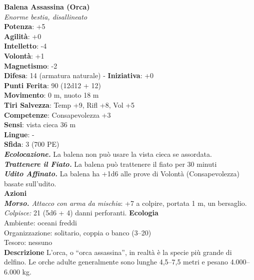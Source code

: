 \begin{multicols}{2}
\medskip\textbf{Balena Assassina (Orca)}\\
\emph{Enorme bestia, disallineato}\\
\textbf{Potenza}: +5\\
\textbf{Agilità}: +0\\
\textbf{Intelletto}: -4\\
\textbf{Volontà}: +1\\
\textbf{Magnetismo}: -2\\
\textbf{Difesa}: 14 (armatura naturale) - \textbf{Iniziativa}: +0\\
\textbf{Punti Ferita}: 90 (12d12 + 12)\\
\textbf{Movimento}: 0 m, nuoto 18 m\\
\textbf{Tiri Salvezza}: Temp +9, Rifl +8, Vol +5\\
\textbf{Competenze}: Consapevolezza +3\\
\textbf{Sensi}: vista cieca 36 m\\
\textbf{Lingue}: -\\
\textbf{Sfida}: 3 (700 PE)\smallskip\\
\emph{\textbf{Ecolocazione.}} La balena non può usare la vista cieca se assordata.\\
\emph{\textbf{Trattenere il Fiato.}} La balena può trattenere il fiato per 30 minuti\\
\emph{\textbf{Udito Affinato.}} La balena ha +1d6 alle prove di Volontà (Consapevolezza) basate sull'udito.\\
\smallskip\textbf{Azioni}\\
\emph{\textbf{Morso.} Attacco con arma da mischia}: +7 a colpire, portata 1 m, un bersaglio.\\
\emph{Colpisce:} 21 (5d6 + 4) danni perforanti.
\textbf{Ecologia}\\
Ambiente: oceani freddi\\
Organizzazione: solitario, coppia o banco (3–20)\\
Tesoro: nessuno\\
\textbf{Descrizione}
L’orca, o “orca assassina”, in realtà è la specie più grande di delfino. Le orche adulte generalmente sono lunghe 4,5–7,5 metri e pesano 4.000–6.000 kg.\\


\end{multicols}
